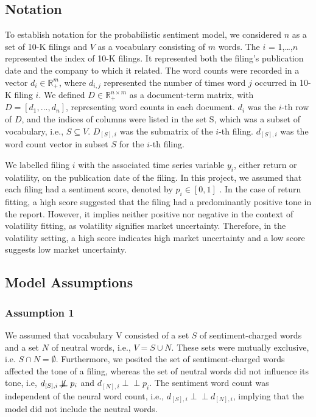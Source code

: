\documentclass[logo,bsc,singlespacing,parskip]{infthesis}
\begin{document}
\subsection{Notation}
To establish notation for the probabilistic sentiment model, we considered $n$ as a set of 10-K filings and $V$ as a vocabulary consisting of $m$ words. The $i$ = 1,…,$n$ represented the index of 10-K filings. It represented both the filing’s publication date and the company to which it related. The word counts were recorded in a vector $d_i \in \mathbb{R}^m_+$, where $d_{i,j}$ represented the number of times word $j$ occurred in 10-K filing $i$. We defined $D \in \mathbb{R}^{n \times m}_+$ as a document-term matrix, with $D = [d_1, ..., d_n]$, representing word counts in each document. $d_i$ was the  $i$-th row of $D$, and the indices of columns were listed in the set S, which was a subset of vocabulary, i.e., $S \subseteq V$. $D_{[S],i}$ was the submatrix of the $i$-th filing. $d_{[S],i}$ was the word count vector in subset $S$ for the $i$-th filing.

We labelled filing $i$ with the associated time series variable $y_i$, either return or volatility, on the publication date of the filing. In this project, we assumed that each filing had a sentiment score, denoted by $p_i \in [0,1]$
. In the case of return fitting, a high score suggested that the filing had a predominantly positive tone in the report. However, it implies neither positive nor negative in the context of volatility fitting, as volatility signifies market uncertainty. Therefore, in the volatility setting, a high score indicates high market uncertainty and a low score suggests low market uncertainty.

\subsection{Model Assumptions}
\subsubsection{Assumption 1}
We assumed that vocabulary V consisted of a set $S$ of sentiment-charged words and a set $N$ of neutral words, i.e., $V = S \cup N$. These sets were mutually exclusive, i.e. $S \cap N = \emptyset
$. Furthermore, we posited the set of sentiment-charged words affected the tone of a filing, whereas the set of neutral words did not influence its tone, i.e, $ d_{[S], i} \not\!\perp\!\!\!\perp
 p_i$ and $ d_{[N], i} \perp \!\!\! \perp p_i$. The sentiment word count was independent of the neural word count, i.e., $d_{[S], i} \perp \!\!\! \perp d_{[N], i}$, implying that the model did not include the neutral words. 
\end{document}
